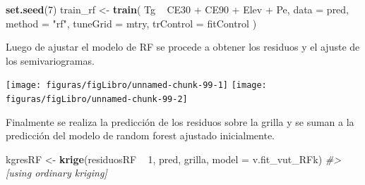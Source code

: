 \documentclass[11pt,b5paper,]{krantz}
\newenvironment{Shaded}{}{}
\newcommand{\CommentTok}[1]{\textcolor[rgb]{0.38,0.63,0.69}{\textit{#1}}}
\newcommand{\DataTypeTok}[1]{\textcolor[rgb]{0.56,0.13,0.00}{#1}}
\newcommand{\DecValTok}[1]{\textcolor[rgb]{0.25,0.63,0.44}{#1}}
\newcommand{\KeywordTok}[1]{\textcolor[rgb]{0.00,0.44,0.13}{\textbf{#1}}}
\newcommand{\NormalTok}[1]{#1}
\newcommand{\OperatorTok}[1]{\textcolor[rgb]{0.40,0.40,0.40}{#1}}
\newcommand{\StringTok}[1]{\textcolor[rgb]{0.25,0.44,0.63}{#1}}
\begin{document}
\begin{Shaded}
\begin{Highlighting}[]
\KeywordTok{set.seed}\NormalTok{(}\DecValTok{7}\NormalTok{)}
\NormalTok{train_rf <-}\StringTok{ }\KeywordTok{train}\NormalTok{(}
\NormalTok{  Tg }\OperatorTok{~}\StringTok{ }\NormalTok{CE30 }\OperatorTok{+}\StringTok{ }\NormalTok{CE90 }\OperatorTok{+}\StringTok{ }\NormalTok{Elev }\OperatorTok{+}\StringTok{ }\NormalTok{Pe,}
  \DataTypeTok{data =}\NormalTok{ pred,}
  \DataTypeTok{method =} \StringTok{"rf"}\NormalTok{,}
  \DataTypeTok{tuneGrid =}\NormalTok{ mtry,}
  \DataTypeTok{trControl =}\NormalTok{ fitControl}
\NormalTok{)}
\end{Highlighting}
\end{Shaded}

Luego de ajustar el modelo de RF se procede a obtener los residuos y el ajuste de los semivariogramas.

\begin{Shaded}
\end{Shaded}

\begin{center}\texttt{[image: figuras/figLibro/unnamed-chunk-99-1]} \texttt{[image: figuras/figLibro/unnamed-chunk-99-2]} \end{center}

Finalmente se realiza la predicción de los residuos sobre la grilla y se suman a la predicción del modelo de random forest ajustado inicialmente.

\begin{Shaded}
\begin{Highlighting}[]
\NormalTok{kgresRF <-}\StringTok{ }\KeywordTok{krige}\NormalTok{(residuosRF }\OperatorTok{~}\StringTok{ }\DecValTok{1}\NormalTok{, pred, }
\NormalTok{                 grilla, }\DataTypeTok{model =}\NormalTok{ v.fit_vut_RFk)}
\CommentTok{#> [using ordinary kriging]}
\end{Highlighting}
\end{Shaded}
\end{document}
